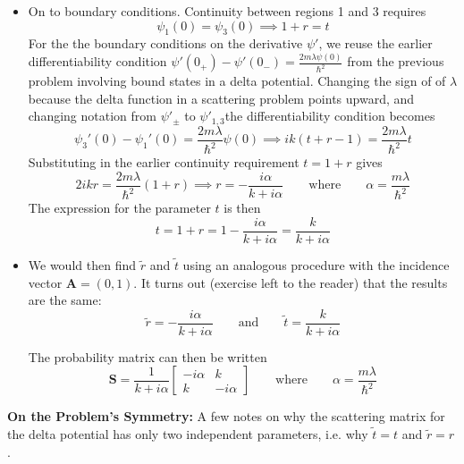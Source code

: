 \documentclass[11pt, a4paper]{article}
\newcommand{\eqtext}[1]{\qquad \text{#1} \qquad}
\renewcommand{\vec}[1]{\bm{#1}} %
\newcommand{\mat}[1]{\mathbf{#1}} %
\begin{document}
\begin{itemize}
	\item On to boundary conditions. Continuity between regions 1 and 3 requires
	\begin{equation*}
		\psi_{1}(0) = \psi_{3}(0) \implies 1 + r = t
	\end{equation*} 
	For the the boundary conditions on the derivative $ \psi' $, we reuse the earlier differentiability condition $ \psi'(0_{+}) - \psi'(0_{-}) = \frac{2m\lambda\psi(0)}{\hbar^{2}} $ from the previous problem involving bound states in a delta potential. Changing the sign of of $ \lambda $ because the delta function in a scattering problem points upward, and changing notation from $ \psi'_{\pm} $ to $ \psi'_{1,3} $the differentiability condition becomes
	\begin{equation*}
		\psi_{3}'(0) - \psi_{1}'(0) = \frac{2m\lambda}{\hbar^{2}} \psi(0) \implies ik(t + r -1) = \frac{2m\lambda}{\hbar^{2}} t
	\end{equation*}
	Substituting in the earlier continuity requirement $ t = 1 + r $ gives
	\begin{equation*}
		2ikr = \frac{2m\lambda}{\hbar^{2}} (1 + r) \implies r = -\frac{i\alpha}{k + i\alpha} \eqtext{where} \alpha = \frac{m\lambda}{\hbar^{2}}
	\end{equation*}
	The expression for the parameter $ t $ is then
	\begin{equation*}
		t = 1 + r = 1 - \frac{i\alpha}{k + i\alpha} = \frac{k}{k + i\alpha}
	\end{equation*}
	
	\item We would then find $ \tilde{r} $ and $ \tilde{t} $ using an analogous procedure with the incidence vector $ \vec{A} = (0, 1) $. It turns out (exercise left to the reader) that the results are the same:
	\begin{equation*}
		\tilde{r} = -\frac{i\alpha}{k + i\alpha}  \eqtext{and} \tilde{t} = \frac{k}{k + i\alpha}
	\end{equation*}
	
	The probability matrix can then be written
	\begin{equation*}
		\mat{S} = \frac{1}{k + i \alpha} 
		\begin{bmatrix}
			- i \alpha & k\\
			k & - i \alpha
		\end{bmatrix} 
		\eqtext{where}
		\alpha = \frac{m\lambda}{\hbar^{2}}
	\end{equation*}
\end{itemize}
\textbf{On the Problem's Symmetry:} A few notes on why the scattering matrix for the delta potential has only two independent parameters, i.e. why $ \tilde{t} = t $ and $ \tilde{r} = r $.
\end{document}
